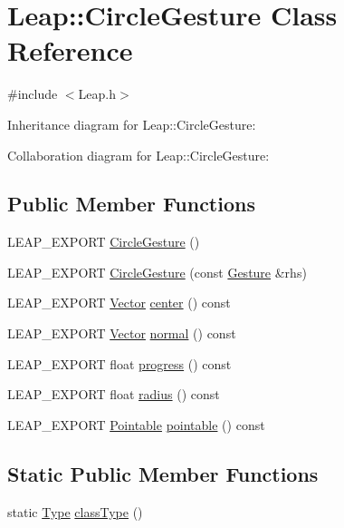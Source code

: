 \hypertarget{class_leap_1_1_circle_gesture}{}\section{Leap\+:\+:Circle\+Gesture Class Reference}
\label{class_leap_1_1_circle_gesture}


{\ttfamily \#include $<$Leap.\+h$>$}



Inheritance diagram for Leap\+:\+:Circle\+Gesture\+:


Collaboration diagram for Leap\+:\+:Circle\+Gesture\+:
\subsection*{Public Member Functions}
\begin{DoxyCompactItemize}
\item 
L\+E\+A\+P\+\_\+\+E\+X\+P\+O\+RT \hyperlink{class_leap_1_1_circle_gesture_a67ac2907b68958693129eb7a6f731722}{Circle\+Gesture} ()
\item 
L\+E\+A\+P\+\_\+\+E\+X\+P\+O\+RT \hyperlink{class_leap_1_1_circle_gesture_a3a27444e1657e1ecf3e74bc9c7cad292}{Circle\+Gesture} (const \hyperlink{class_leap_1_1_gesture}{Gesture} \&rhs)
\item 
L\+E\+A\+P\+\_\+\+E\+X\+P\+O\+RT \hyperlink{struct_leap_1_1_vector}{Vector} \hyperlink{class_leap_1_1_circle_gesture_aa37a274c3c68607c696c1b1580574105}{center} () const
\item 
L\+E\+A\+P\+\_\+\+E\+X\+P\+O\+RT \hyperlink{struct_leap_1_1_vector}{Vector} \hyperlink{class_leap_1_1_circle_gesture_a8aea3fdef557853fbe443d04919b56ee}{normal} () const
\item 
L\+E\+A\+P\+\_\+\+E\+X\+P\+O\+RT float \hyperlink{class_leap_1_1_circle_gesture_ab7e8c9e8e22bfa699454a1a117410706}{progress} () const
\item 
L\+E\+A\+P\+\_\+\+E\+X\+P\+O\+RT float \hyperlink{class_leap_1_1_circle_gesture_a8d6b58af283d1c58bfed73d149a1dbe3}{radius} () const
\item 
L\+E\+A\+P\+\_\+\+E\+X\+P\+O\+RT \hyperlink{class_leap_1_1_pointable}{Pointable} \hyperlink{class_leap_1_1_circle_gesture_aedf367c1c2750043dfbc02612a2bd7d7}{pointable} () const
\end{DoxyCompactItemize}
\subsection*{Static Public Member Functions}
\begin{DoxyCompactItemize}
\item 
static \hyperlink{class_leap_1_1_gesture_a6fa6dd4f28c502f0d55abc6b71c6f9b1}{Type} \hyperlink{class_leap_1_1_circle_gesture_a8935a8a71b0a174a1656ff2caab80a06}{class\+Type} ()
\end{DoxyCompactItemize}
